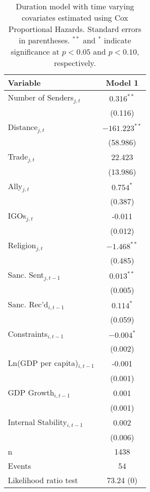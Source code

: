 \begin{table}[ht]
\centering
{\normalsize
\begin{tabular}{lc}
 Variable & Model 1 \\ 
  \hline
\hline
Number of Senders$_{j,t}$ & $0.316^{\ast\ast}$ \\ 
   & (0.116) \\ 
  Distance$_{j,t}$ & $-161.223^{\ast\ast}$ \\ 
   & (58.986) \\ 
  Trade$_{j,t}$ & 22.423 \\ 
   & (13.986) \\ 
  Ally$_{j,t}$ & $0.754^{\ast}$ \\ 
   & (0.387) \\ 
  IGOs$_{j,t}$ & -0.011 \\ 
   & (0.012) \\ 
  Religion$_{j,t}$ & $-1.468^{\ast\ast}$ \\ 
   & (0.485) \\ 
   \hline
Sanc. Sent$_{j,t-1}$ & $0.013^{\ast\ast}$ \\ 
   & (0.005) \\ 
  Sanc. Rec'd$_{i,t-1}$ & $0.114^{\ast}$ \\ 
   & (0.059) \\ 
   \hline
Constraints$_{i,t-1}$ & $-0.004^{\ast}$ \\ 
   & (0.002) \\ 
  Ln(GDP per capita)$_{i,t-1}$ & -0.001 \\ 
   & (0.001) \\ 
  GDP Growth$_{i,t-1}$ & 0.001 \\ 
   & (0.001) \\ 
  Internal Stability$_{i,t-1}$ & 0.002 \\ 
   & (0.006) \\ 
   \hline
n & 1438 \\ 
  Events & 54 \\ 
  Likelihood ratio test & 73.24 (0) \\ 
   \hline
\hline
\end{tabular}
}
\caption{Duration model with time varying covariates estimated using Cox Proportional Hazards. Standard errors in parentheses. $^{**}$ and $^{*}$ indicate significance at $p< 0.05 $ and $p< 0.10 $, respectively.} 
\label{tab:regResults}
\end{table}
